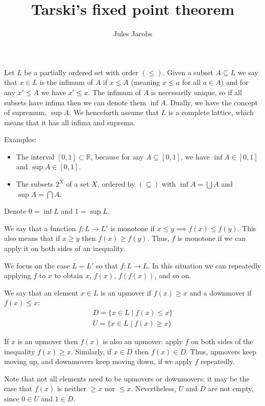 \documentclass[a4paper, 11pt]{article}
\title{Tarski's fixed point theorem}
\author{Jules Jacobs}
\newcommand{\R}{\mathbb{R}}
\begin{document}
\maketitle

Let $L$ be a partially ordered set with order $(\leq)$. Given a subset $A \subseteq L$ we say that $x \in L$ is the infimum of $A$ if $x \leq A$ (meaning $x \leq a$ for all $a \in A$) and for any $x' \leq A$ we have $x' \leq x$. The infimum of $A$ is necessarily unique, so if all subsets have infima then we can denote them $\inf A$. Dually, we have the concept of supremum, $\sup A$. We henceforth assume that $L$ is a complete lattice, which means that it has all infima and suprema.

\bigskip

Examples:
\begin{itemize}
  \item The interval $[0,1] \subset \R$, because for any $A \subseteq [0,1]$, we have $\inf A \in [0,1]$ and $\sup A \in [0,1]$.
  \item The subsets $2^X$ of a set $X$, ordered by $(\subseteq)$ with $\inf A = \bigcup A$ and $\sup A = \bigcap A$.
\end{itemize}

Denote $0 = \inf L$ and $1 = \sup L$.

\medskip

We say that a function $f : L \to L'$ is monotone if $x \leq y \implies f(x) \leq f(y)$. This also means that if $x \geq y$ then $f(x) \geq f(y)$. Thus, $f$ is monotone if we can apply it on both sides of an inequality.

We focus on the case $L = L'$ so that $f : L \to L$. In this situation we can repeatedly applying $f$ to $x$ to obtain $x$, $f(x)$, $f(f(x))$, and so on.

We say that an element $x \in L$ is an upmover if $f(x) \geq x$ and a downmover if $f(x) \leq x$:
\begin{align}
  D = \{x \in L \mid f(x) \leq x\} \\
  U = \{x \in L \mid f(x) \geq x\}
\end{align}

If $x$ is an upmover then $f(x)$ is also an upmover: apply $f$ on both sides of the inequality $f(x) \geq x$. Similarly, if $x \in D$ then $f(x) \in D$. Thus, upmovers keep moving up, and downmovers keep moving down, if we apply $f$ repeatedly.

Note that not all elements need to be upmovers or downmovers; it may be the case that $f(x)$ is neither $\geq x$ nor $\leq x$. Nevertheless, $U$ and $D$ are not empty, since $0 \in U$ and $1 \in D$.
\end{document}
